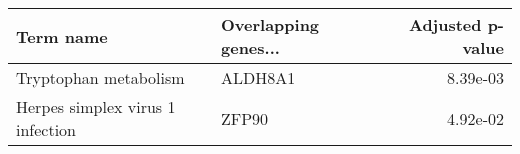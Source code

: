 \begin{tabular}{llr}
\toprule
                       Term name & Overlapping genes... &  Adjusted p-value \\
\midrule
           Tryptophan metabolism &              ALDH8A1 &          8.39e-03 \\
Herpes simplex virus 1 infection &                ZFP90 &          4.92e-02 \\
\bottomrule
\end{tabular}
